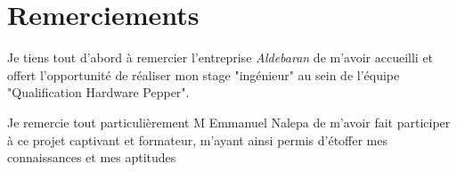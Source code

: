 
\chapter*{Remerciements}
Je tiens tout d'abord à remercier l'entreprise \emph{Aldebaran} de m'avoir accueilli et offert l'opportunité de réaliser mon stage "ingénieur" au sein de l'équipe "Qualification Hardware Pepper".

Je remercie tout particulièrement M Emmanuel Nalepa de m'avoir fait participer à ce projet captivant et formateur, m'ayant ainsi permis d'étoffer mes connaissances et mes aptitudes 
